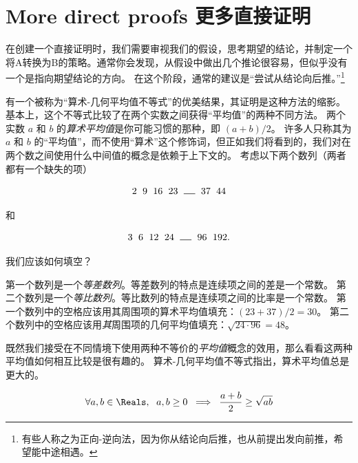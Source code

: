 \newpage




\newpage


\section{More direct proofs 更多直接证明}
\label{sec:more}

在创建一个直接证明时，我们需要审视我们的假设，思考期望的结论，并制定一个将A转换为B的策略。通常你会发现，从假设中做出几个推论很容易，但似乎没有一个是指向期望结论的方向。
在这个阶段，通常的建议是“尝试从结论向后推。”\footnote{有些人称之为正向-逆向法，因为你从结论向后推，也从前提出发向前推，希望能中途相遇。}

有一个被称为“算术-几何平均值不等式”的优美结果，其证明是这种方法的缩影。
基本上，这个不等式比较了在两个实数之间获得“平均值”的两种不同方法。
两个实数 $a$ 和 $b$ 的\emph{算术平均值}是你可能习惯的那种，即 $(a+b)/2$。
许多人只称其为 $a$ 和 $b$ 的“平均值”，而不使用“算术”这个修饰词，但正如我们将看到的，我们对在两个数之间使用什么中间值的概念是依赖于上下文的。
考虑以下两个数列（两者都有一个缺失的项）

\[ 2 \rule{6pt}{0pt} 9  \rule{6pt}{0pt} 16  \rule{6pt}{0pt} 23  \rule{6pt}{0pt} \rule{12pt}{.5pt}  \rule{6pt}{0pt} 37  \rule{6pt}{0pt} 44 \]

\noindent 和

\[ 3 \rule{6pt}{0pt} 6  \rule{6pt}{0pt} 12  \rule{6pt}{0pt} 24  \rule{6pt}{0pt} \rule{12pt}{.5pt}  \rule{6pt}{0pt} 96  \rule{6pt}{0pt} 192. \]

\noindent 我们应该如何填空？

第一个数列是一个\emph{等差数列}。等差数列的特点是连续项之间的差是一个常数。
第二个数列是一个\emph{等比数列}。等比数列的特点是连续项之间的比率是一个常数。
第一个数列中的空格应该用其周围项的算术平均值填充：$(23+37)/2 = 30$。
第二个数列中的空格应该用\emph{其}周围项的几何平均值填充：$\sqrt{24\cdot 96} = 48$。

既然我们接受在不同情境下使用两种不等价的\emph{平均值}概念的效用，那么看看这两种平均值如何相互比较是很有趣的。
算术-几何平均值不等式指出，算术平均值总是更大的。

\[ \forall a,b \in \Reals, \rule{6pt}{0pt}  a,b \geq 0 \; \implies \; \frac{a+b}{2} \geq \sqrt{ab} \]

